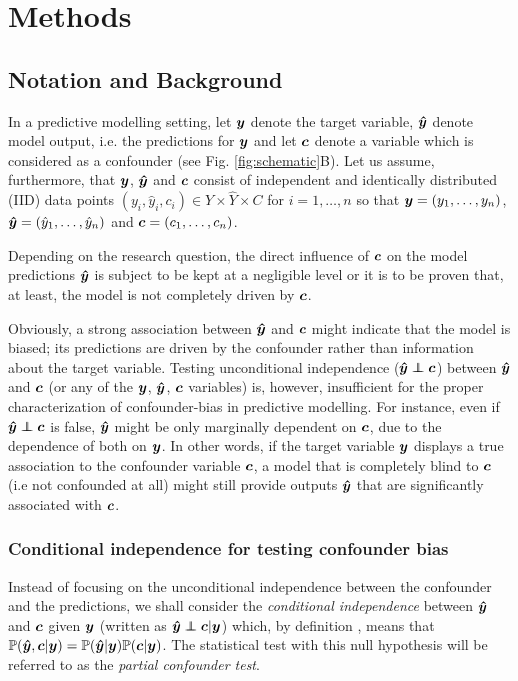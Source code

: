 \documentclass{article}
\begin{document}
\section{Methods}
\label{sec:methods}

\subsection{Notation and Background}

In a predictive modelling setting, let $\boldsymbol{y}$ denote the target variable, $\boldsymbol{\hat{y}}$ denote model output, i.e. the predictions for $\boldsymbol{y}$ and let $\boldsymbol{c}$ denote a variable which is considered as a confounder (see Fig. \ref{fig:schematic}B). Let us assume, furthermore, that $\boldsymbol{y}$, $\boldsymbol{\hat{y}}$ and $\boldsymbol{c}$ consist of independent and identically distributed (IID) data points $(y_i, \hat{y}_i, c_i) \in Y \times \hat{Y} \times C$ for $i=1, \dots , n$ so that $\boldsymbol{y}=(y_1, \dots ,y_n)$, $\boldsymbol{\hat{y}}=(\hat{y}_1, \dots, \hat{y}_n)$ and $\boldsymbol{c}=(c_1, \dots, c_n)$. 

Depending on the research question, the direct influence of $\boldsymbol{c}$ on the model predictions $\boldsymbol{\hat{y}}$ is subject to be kept at a negligible level or it is to be proven that, at least, the model is not completely driven by $\boldsymbol{c}$.

Obviously, a strong association between $\boldsymbol{\hat{y}}$ and $\boldsymbol{c}$ might indicate that the model is biased; its predictions are driven by the confounder rather than information about the target variable.
Testing unconditional independence ($\yhat \independent \c$) between $\boldsymbol{\hat{y}}$ and $\boldsymbol{c}$ (or any of the $\boldsymbol{y}$, $\boldsymbol{\hat{y}}$, $\boldsymbol{c}$ variables) is, however, insufficient for the proper characterization of confounder-bias in predictive modelling.
For instance, even if $\yhat \independent \c$ is false, $\boldsymbol{\hat{y}}$ might be only marginally dependent on $\boldsymbol{c}$, due to the dependence of both on $\boldsymbol{y}$. In other words, if the target variable $\boldsymbol{y}$ displays a true association to the confounder variable $\boldsymbol{c}$, a model that is completely blind to $\boldsymbol{c}$ (i.e not confounded at all) might still provide outputs $\boldsymbol{\hat{y}}$ that are significantly associated with $\boldsymbol{c}$.

\subsubsection*{Conditional independence for testing confounder bias}

Instead of focusing on the unconditional independence between the confounder and the predictions, we shall consider the \emph{conditional independence} between $\boldsymbol{\hat{y}}$ and $\boldsymbol{c}$ given $\boldsymbol{y}$ (written as $\yhat \independent \c | \y$) which, by definition  \citep{dawid1979conditional}, means that $\mathbb{P}(\boldsymbol{\hat{y}}, \boldsymbol{c}|\boldsymbol{y}) = \mathbb{P}(\boldsymbol{\hat{y}}|\boldsymbol{y})\mathbb{P}(\boldsymbol{c}|\boldsymbol{y})$. The statistical test with this null hypothesis will be referred to as the \emph{partial confounder test}.
\end{document}
